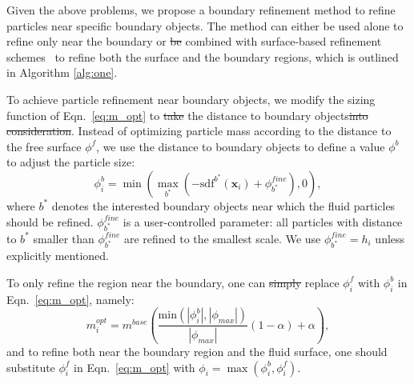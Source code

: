 \documentclass[VANCOUVER,STIX1COL]{WileyNJD-v2}
\providecommand{\DIFadd}[1]{{\protect\color{blue}\uwave{#1}}} %
\providecommand{\DIFdel}[1]{{\protect\color{red}\sout{#1}}}                      %
\providecommand{\DIFaddbegin}{} %
\providecommand{\DIFaddend}{} %
\providecommand{\DIFdelbegin}{} %
\providecommand{\DIFdelend}{} %
\begin{document}
Given the above problems, we propose a boundary refinement method to refine particles near specific boundary objects. The method can either be used alone to refine only near the boundary or \DIFdelbegin \DIFdel{be }\DIFdelend combined with surface-based refinement schemes~\cite{Winchenbach17} to refine both the surface and the boundary regions, which is outlined in Algorithm \ref{alg:one}.

To achieve particle refinement near boundary objects, we modify the sizing function of Eqn.~\ref{eq:m_opt} to \DIFdelbegin \DIFdel{take }\DIFdelend \DIFaddbegin \DIFadd{consider }\DIFaddend the distance to boundary objects\DIFdelbegin \DIFdel{into consideration}\DIFdelend . Instead of optimizing particle mass according to the distance to the free surface $\phi^f$, we use the distance to boundary objects to define a value $\phi^b$ to adjust the particle size:
\begin{equation}
    \phi_i^b = \min\left(\max_{b^*}\left(-\mathrm{sdf}^{b^*}(\mathbf{x}_i) + \phi_{b^*}^{fine}\right), 0\right),
    \label{eq:bound_distance}
\end{equation}
where $b^*$ denotes the interested boundary objects near which the fluid particles should be refined. $\phi_{b^*}^{fine}$ is a user-controlled parameter: all particles with distance to $b^*$ smaller than $\phi_{b^*}^{fine}$ are refined to the smallest scale. We use $\phi_{b^*}^{fine} = h_i$ unless explicitly mentioned.

To only refine the region near the boundary, one can \DIFdelbegin \DIFdel{simply }\DIFdelend replace $\phi_i^f$ with $\phi_i^b$ in Eqn.~\ref{eq:m_opt}, namely:
\begin{equation}
    m_i^{opt} = m^{base}\left(
    \frac{\mathrm{min}(|\phi_i^b|,|\phi_{max}|)}{|\phi_{max}|}
    (1 - \alpha) + \alpha
    \right),
    \label{eq:refine_bound}
\end{equation}
and to refine both near the boundary region and the fluid surface, one should substitute $\phi_i^f$ in Eqn.~\ref{eq:m_opt} with $\phi_i = \max(\phi_i^b, \phi_i^f)$.
\end{document}
